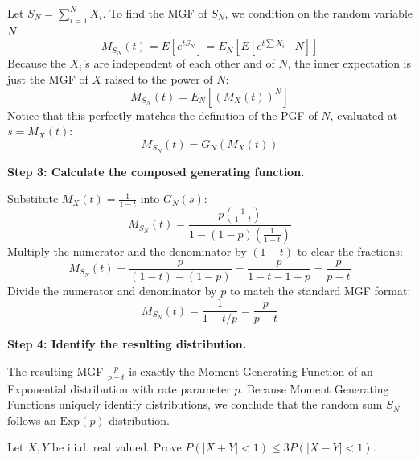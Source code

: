 \begin{solution}
Let $S_N = \sum_{i=1}^N X_i$. To find the MGF of $S_N$, we condition on the random variable $N$:
\[ M_{S_N}(t) = E[e^{t S_N}] = E_N [ E [ e^{t \sum X_i} \mid N ] ] \]
Because the $X_i$'s are independent of each other and of $N$, the inner expectation is just the MGF of $X$ raised to the power of $N$:
\[ M_{S_N}(t) = E_N [ (M_X(t))^N ] \]
Notice that this perfectly matches the definition of the PGF of $N$, evaluated at $s = M_X(t)$:
\[ M_{S_N}(t) = G_N(M_X(t)) \]

\textbf{Step 3: Calculate the composed generating function.}

Substitute $M_X(t) = \frac{1}{1-t}$ into $G_N(s)$:
\[ M_{S_N}(t) = \frac{p \left( \frac{1}{1-t} \right)}{1 - (1-p) \left( \frac{1}{1-t} \right)} \]
Multiply the numerator and the denominator by $(1-t)$ to clear the fractions:
\[ M_{S_N}(t) = \frac{p}{(1-t) - (1-p)} = \frac{p}{1 - t - 1 + p} = \frac{p}{p - t} \]
Divide the numerator and denominator by $p$ to match the standard MGF format:
\[ M_{S_N}(t) = \frac{1}{1 - t/p} = \frac{p}{p - t} \]

\textbf{Step 4: Identify the resulting distribution.}

The resulting MGF $\frac{p}{p - t}$ is exactly the Moment Generating Function of an Exponential distribution with rate parameter $p$.
Because Moment Generating Functions uniquely identify distributions, we conclude that the random sum $S_N$ follows an $\text{Exp}(p)$ distribution.
\end{solution}

\begin{exercise}\label{probability:2012:9}
Let $X, Y$ be i.i.d. real valued. Prove $P(|X+Y| < 1) \leq 3 P(|X-Y| < 1)$.
\end{exercise}

